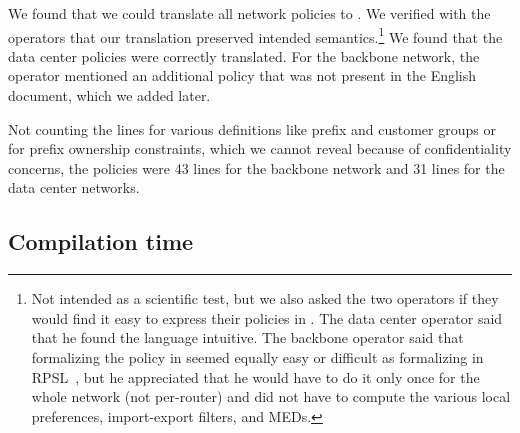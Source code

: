 We found that we could translate all network policies to \sysname. We verified with the operators that our translation preserved intended semantics.\footnote{Not intended as a scientific test, but we also asked the two operators if they would find it easy to express their policies in \sysname. The data center operator said that he found the language intuitive. The backbone operator said that formalizing the policy in \sysname seemed equally easy or difficult as formalizing in RPSL~\cite{x}, but he appreciated that he would have to do it only once for the whole network (not per-router) and did not have to compute the various local preferences, import-export filters, and MEDs.} We found that the data center policies were correctly translated. For the backbone network, the operator mentioned an additional policy that was not present in the English document, which we added later.

Not counting the lines for various definitions like prefix and customer groups or for prefix ownership constraints, which we cannot reveal because of confidentiality concerns, the \sysname policies were 43 lines for the backbone network and 31 lines for the data center networks.

\subsection{Compilation time}


